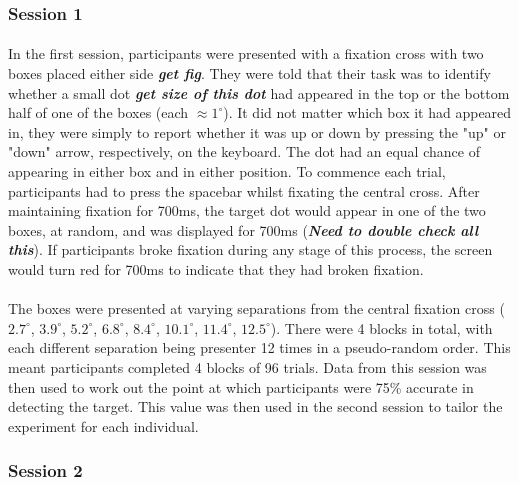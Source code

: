 \documentclass[12pt]{article}
\begin{document}
\subsubsection*{Session 1}
\paragraph{} In the first session, participants were presented with a fixation cross with two boxes placed either side \textit{\textbf{get fig}}. They were told that their task was to identify whether a small dot \textit{\textbf{get size of this dot}} had appeared in the top or the bottom half of one of the boxes (each $\approx1^{\circ}$). It did not matter which box it had appeared in, they were simply to report whether it was up or down by pressing the "up" or "down" arrow, respectively, on the keyboard. The dot had an equal chance of appearing in either box and in either position. To commence each trial, participants had to press the spacebar whilst fixating the central cross. After maintaining fixation for 700ms, the target dot would appear in one of the two boxes, at random, and was displayed for 700ms (\textit{\textbf{Need to double check all this}}). If participants broke fixation during any stage of this process, the screen would turn red for 700ms to indicate that they had broken fixation. 

\paragraph{} The boxes were presented at varying separations from the central fixation cross ($2.7^{\circ}$, $3.9^{\circ}$, $5.2^{\circ}$, $6.8^{\circ}$, $8.4^{\circ}$, $10.1^{\circ}$, $11.4^{\circ}$, $12.5^{\circ}$). There were 4 blocks in total, with each different separation being presenter 12 times in a pseudo-random order. This meant participants completed 4 blocks of 96 trials. Data from this session was then used to work out the point at which participants were 75\% accurate in detecting the target. This value was then used in the second session to tailor the experiment for each individual.

\subsubsection*{Session 2}  
\end{document}
